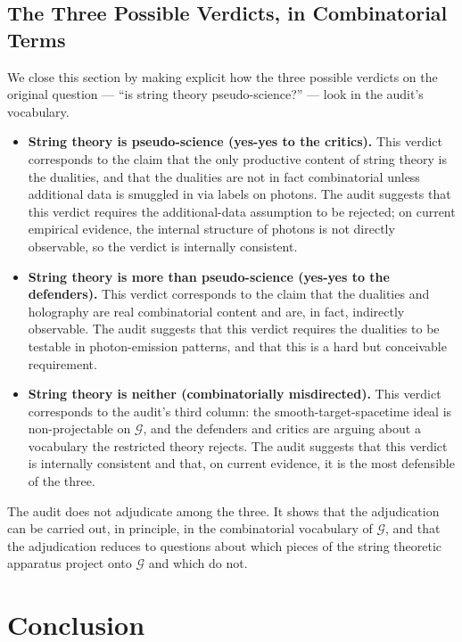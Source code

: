 \documentclass[11pt]{article}
\begin{document}
\subsection{The Three Possible Verdicts, in Combinatorial Terms}

We close this section by making explicit how the three possible verdicts on the original question --- ``is string theory pseudo-science?'' --- look in the audit's vocabulary.
\begin{itemize}
    \item \textbf{String theory is pseudo-science (yes-yes to the critics).} This verdict corresponds to the claim that the only productive content of string theory is the dualities, and that the dualities are not in fact combinatorial unless additional data is smuggled in via labels on photons. The audit suggests that this verdict requires the additional-data assumption to be rejected; on current empirical evidence, the internal structure of photons is not directly observable, so the verdict is internally consistent.
    \item \textbf{String theory is more than pseudo-science (yes-yes to the defenders).} This verdict corresponds to the claim that the dualities and holography are real combinatorial content and are, in fact, indirectly observable. The audit suggests that this verdict requires the dualities to be testable in photon-emission patterns, and that this is a hard but conceivable requirement.
    \item \textbf{String theory is neither (combinatorially misdirected).} This verdict corresponds to the audit's third column: the smooth-target-spacetime ideal is non-projectable on $\mathcal{G}$, and the defenders and critics are arguing about a vocabulary the restricted theory rejects. The audit suggests that this verdict is internally consistent and that, on current evidence, it is the most defensible of the three.
\end{itemize}

The audit does not adjudicate among the three. It shows that the adjudication can be carried out, in principle, in the combinatorial vocabulary of $\mathcal{G}$, and that the adjudication reduces to questions about which pieces of the string theoretic apparatus project onto $\mathcal{G}$ and which do not.

\section{Conclusion}
\end{document}
